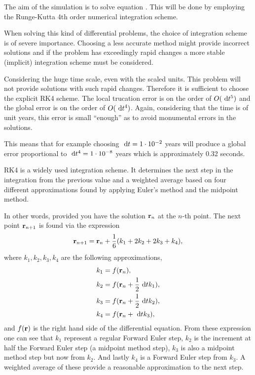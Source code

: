 The aim of the simulation is to solve equation
. This will be done by employing the
Runge-Kutta 4th order numerical integration scheme.

When solving this kind of differential problems, the choice of
integration scheme is of severe importance. Choosing a less
accurate method might provide incorrect solutions and if the
problem has exceedingly rapid changes a more stable (implicit)
integration scheme must be considered.

Considering the huge time scale, even with the scaled units. This
problem will not provide solutions with such rapid changes.
Therefore it is sufficient to choose the explicit RK4 scheme. The
local trucation error is on the order of $O(\ \mathrm{d}t^5)$ and the global
error is on the order of $O(\ \mathrm{d}t^4)$. Again, considering that the
time is of unit years, this error is small ``enough'' as to avoid
monumental errors in the solutions.

This means that for example choosing $\ \mathrm{d}t = 1 \cdot 10^{-2}$ years
will produce a global error proportional to $\ \mathrm{d}t^4 = 1 \cdot
10^{-8}$ years which is approximately 0.32 seconds.

RK4 is a widely used integration scheme. It determines the next
step in the integration from the previous value and a weighted
average based on four different approximations found by applying
Euler's method and the midpoint method.

In other words, provided you have the solution $\mathbf{r}_n$ at the
$n$-th point. The next point $\mathbf{r}_{n+1}$ is found via the expression
\[ \mathbf{r}_{n+1} = \mathbf{r}_n + \frac{1}{6}(k_1 + 2k_2 + 2k_3 + k_4), \] where 
$k_1,k_2,k_3,k_4$ are the following approximations,
\begin{align*}
    k_1 &= f(\mathbf{r}_n), \\
    k_2 &= f(\mathbf{r}_n + \frac{1}{2}\ \mathrm{d}t k_1), \\
    k_3 &= f(\mathbf{r}_n + \frac{1}{2}\ \mathrm{d}t k_2), \\
    k_4 &= f(\mathbf{r}_n + \ \mathrm{d}t k_3),
\end{align*}
and $f(\mathbf{r})$ is the right hand side of the differential equation.
From these expression one can see that $k_1$ represent a regular
Forward Euler step, $k_2$ is the increment at half the Forward
Euler step (a midpoint method step), $k_3$ is also a midpoint
method step but now from $k_2$. And lastly $k_4$ is a Forward Euler
step from $k_3$. A weighted average of these provide a reasonable
approximation to the next step.
%

